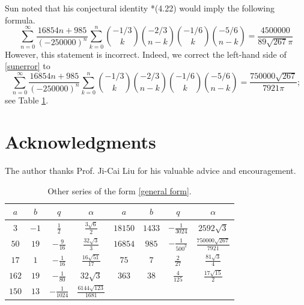 \documentclass{amsart}
\numberwithin{equation}{section}
\begin{document}
Sun \cite{cong-pi-sun} noted that his conjectural identity \cite{cong-pi-sun}*{(4.22)} would imply the following formula.
\begin{equation}
    \sum_{n=0}^\infty \frac{16854n+985}{(-250000)^n}\sum_{k=0}^n \binom{-1/3}{k} \binom{-2/3}{n-k} \binom{-1/6}{k} \binom{-5/6}{n-k}=\frac{4500000}{89\sqrt{267}\pi}
    \label{sunerror}
\end{equation}
However, this statement is incorrect. Indeed, we correct the left-hand side of \eqref{sunerror} to 
\[\sum_{n=0}^\infty \frac{16854n+985}{(-250000)^n}\sum_{k=0}^n \binom{-1/3}{k} \binom{-2/3}{n-k} \binom{-1/6}{k} \binom{-5/6}{n-k}=\frac{750000\sqrt{267}}{7921\pi};\]
see Table \ref{table}. 
\section*{Acknowledgments}
The author thanks Prof. Ji-Cai Liu for his valuable advice and encouragement.


\setlength{\extrarowheight}{0.3cm}
\begin{table}[ht!]
\centering
\begin{tabular}{|c c c c|c c c c|} 
 \hline
$a$ & $b$ & $q$ & $\alpha$ & $a$ & $b$ & $q$ & $\alpha$\\ [0.5ex] 
 \hline\hline
 $3$ & $-1$ & $\frac{1}{2}$ & $\frac{3\sqrt{6}}{2}$ & $18150$ & $1433$ & $-\frac{1}{3024}$ & $2592\sqrt3$\\ 
 $50$ & $19$ & $-\frac{9}{16}$ & $\frac{32\sqrt3}{3}$ & $16854$ & $985$ & $-\frac{1}{500^2}$ & $\frac{750000\sqrt{267}}{7921}$ \\
 $17$ & $1$ & $-\frac{1}{16}$ & $\frac{16\sqrt{51}}{17}$ & $75$ & $7$ & $\frac{2}{27}$ & $\frac{81\sqrt3}4$\\
 $162$ & $19$ & $-\frac{1}{80}$ & $32\sqrt3$ & $363$ & $38$ & $\frac{4}{125}$ & $\frac{17\sqrt{15}}{2}$\\
 $150$ & $13$ & $-\frac{1}{1024}$ & $\frac{6144\sqrt{123}}{1681}$ &  &  &  &  \\ [1ex] 
 \hline
\end{tabular}
\caption{Other series of the form \eqref{general form}.}
\label{table}
\end{table}
\end{document}
